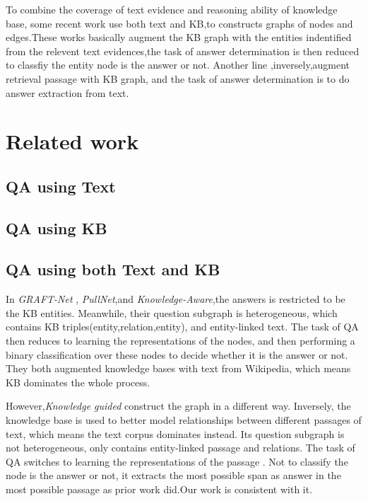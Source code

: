 \documentclass[sigconf]{acmart}
\begin{document}
		To combine the coverage of text evidence and reasoning ability of knowledge base, some recent work  use both text and KB,to constructs graphs of nodes and edges\cite{sun2018open,sun2019pullnet,xiong2019improving}.These works basically augment the KB graph with the entities indentified from the relevent text evidences,the task of answer determination is then reduced to classfiy the entity node is the answer or not.
		Another line\cite{min2019knowledge} ,inversely,augment retrieval passage with KB graph, and the task of answer determination is to do answer extraction from text.
		
	\section{Related work}
	\subsection{QA using Text}
	
	\subsection{QA using KB}
	\subsection{QA using both Text and KB}
	In {\itshape GRAFT-Net}\cite{sun2018open} , {\itshape PullNet}\cite{sun2019pullnet},and{ \itshape Knowledge-Aware}\cite{xiong2019improving},the  answers is restricted to be the KB entities. Meanwhile, their question subgraph is heterogeneous, which contains   KB triples(entity,relation,entity), and entity-linked text. The task of QA then reduces to learning the representations of the nodes, and then performing a binary classification over these nodes to decide whether it is the answer or not. They both augmented knowledge bases with text from Wikipedia, which means KB dominates the whole process.
	
	However,{\itshape Knowledge guided}\cite{min2019knowledge} construct the graph in a different way.  Inversely, the knowledge base is used to better model relationships between different passages of text, which means the text corpus dominates instead. Its question subgraph is not heterogeneous, only contains entity-linked passage and relations. The task of QA  switches to learning the representations of the passage . Not to classify the node is the answer or not, it extracts the most possible span as answer in the most possible passage as prior work did.Our work is consistent with it.
	
\end{document}
